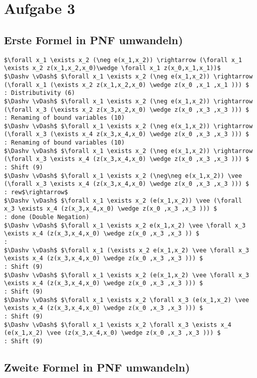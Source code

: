 \section*{Aufgabe 3}

\subsection*{Erste Formel in PNF umwandeln)}


\begin{lstlisting}
$\forall x_1 \exists x_2 (\neg e(x_1,x_2)) \rightarrow (\forall x_1 \exists x_2 z(x_1,x_2,x_0)\wedge \forall x_1 z(x_0,x_1,x_1))$
$\Dashv \vDash$ $\forall x_1 \exists x_2 (\neg e(x_1,x_2)) \rightarrow (\forall x_1 (\exists x_2 z(x_1,x_2,x_0) \wedge z(x_0 ,x_1 ,x_1 ))) $ 
: Distributivity (6)
$\Dashv \vDash$ $\forall x_1 \exists x_2 (\neg e(x_1,x_2)) \rightarrow (\forall x_3 (\exists x_2 z(x_3,x_2,x_0) \wedge z(x_0 ,x_3 ,x_3 ))) $ 
: Renaming of bound variables (10)
$\Dashv \vDash$ $\forall x_1 \exists x_2 (\neg e(x_1,x_2)) \rightarrow (\forall x_3 (\exists x_4 z(x_3,x_4,x_0) \wedge z(x_0 ,x_3 ,x_3 ))) $ 
: Renaming of bound variables (10)
$\Dashv \vDash$ $\forall x_1 \exists x_2 (\neg e(x_1,x_2)) \rightarrow (\forall x_3 \exists x_4 (z(x_3,x_4,x_0) \wedge z(x_0 ,x_3 ,x_3 ))) $ 
: Shift (9)
$\Dashv \vDash$ $\forall x_1 \exists x_2 (\neg\neg e(x_1,x_2)) \vee (\forall x_3 \exists x_4 (z(x_3,x_4,x_0) \wedge z(x_0 ,x_3 ,x_3 ))) $ 
: rew$\rightarrow$
$\Dashv \vDash$ $\forall x_1 \exists x_2 (e(x_1,x_2)) \vee (\forall x_3 \exists x_4 (z(x_3,x_4,x_0) \wedge z(x_0 ,x_3 ,x_3 ))) $ 
: done (Double Negation)
$\Dashv \vDash$ $\forall x_1 \exists x_2 e(x_1,x_2) \vee \forall x_3 \exists x_4 (z(x_3,x_4,x_0) \wedge z(x_0 ,x_3 ,x_3 )) $ 
: 
$\Dashv \vDash$ $\forall x_1 (\exists x_2 e(x_1,x_2) \vee \forall x_3 \exists x_4 (z(x_3,x_4,x_0) \wedge z(x_0 ,x_3 ,x_3 ))) $ 
: Shift (9)
$\Dashv \vDash$ $\forall x_1 \exists x_2 (e(x_1,x_2) \vee \forall x_3 \exists x_4 (z(x_3,x_4,x_0) \wedge z(x_0 ,x_3 ,x_3 ))) $ 
: Shift (9)
$\Dashv \vDash$ $\forall x_1 \exists x_2 \forall x_3 (e(x_1,x_2) \vee \exists x_4 (z(x_3,x_4,x_0) \wedge z(x_0 ,x_3 ,x_3 ))) $ 
: Shift (9)
$\Dashv \vDash$ $\forall x_1 \exists x_2 \forall x_3 \exists x_4 (e(x_1,x_2) \vee (z(x_3,x_4,x_0) \wedge z(x_0 ,x_3 ,x_3 ))) $ 
: Shift (9)
\end{lstlisting}

\subsection*{Zweite Formel in PNF umwandeln)}

